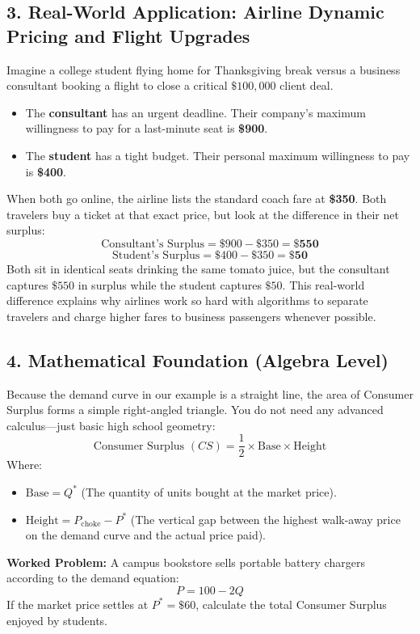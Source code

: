 \documentclass[11pt,letterpaper]{article}
\begin{document}
\subsection*{3. Real-World Application: Airline Dynamic Pricing and Flight Upgrades}
Imagine a college student flying home for Thanksgiving break versus a business consultant booking a flight to close a critical $\$100,000$ client deal. 
\begin{itemize}
    \item The \textbf{consultant} has an urgent deadline. Their company's maximum willingness to pay for a last-minute seat is \textbf{\$900}.
    \item The \textbf{student} has a tight budget. Their personal maximum willingness to pay is \textbf{\$400}.
\end{itemize}
When both go online, the airline lists the standard coach fare at \textbf{\$350}. Both travelers buy a ticket at that exact price, but look at the difference in their net surplus:
\[
\text{Consultant's Surplus} = \$900 - \$350 = \mathbf{\$550}
\]
\[
\text{Student's Surplus} = \$400 - \$350 = \mathbf{\$50}
\]
Both sit in identical seats drinking the same tomato juice, but the consultant captures $\$550$ in surplus while the student captures $\$50$. This real-world difference explains why airlines work so hard with algorithms to separate travelers and charge higher fares to business passengers whenever possible.

\subsection*{4. Mathematical Foundation (Algebra Level)}
Because the demand curve in our example is a straight line, the area of Consumer Surplus forms a simple right-angled triangle. You do not need any advanced calculus—just basic high school geometry:
\begin{equation}
\text{Consumer Surplus } (CS) = \frac{1}{2} \times \text{Base} \times \text{Height}
\end{equation}
Where:
\begin{itemize}
    \item $\text{Base} = Q^*$ (The quantity of units bought at the market price).
    \item $\text{Height} = P_{\text{choke}} - P^*$ (The vertical gap between the highest walk-away price on the demand curve and the actual price paid).
\end{itemize}

\noindent\textbf{Worked Problem:}
A campus bookstore sells portable battery chargers according to the demand equation:
\[
P = 100 - 2Q
\]
If the market price settles at $P^* = \$60$, calculate the total Consumer Surplus enjoyed by students.
\end{document}
